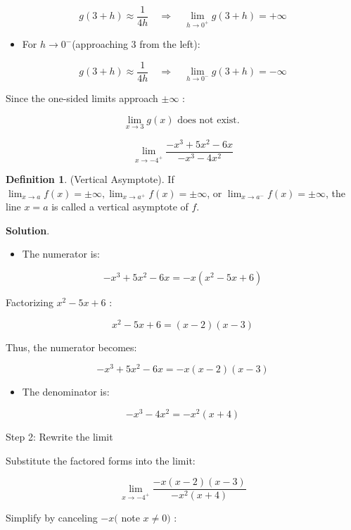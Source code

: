 \documentclass[
]{book}
\providecommand{\tightlist}{%
  \setlength{\itemsep}{0pt}\setlength{\parskip}{0pt}}
\theoremstyle{definition}
\newtheorem{definition}{Definition}[chapter]
\theoremstyle{definition}
\theoremstyle{definition}
\theoremstyle{definition}
\theoremstyle{remark}
\begin{document}
\[
g(3+h) \approx \frac{1}{4 h} \quad \Rightarrow \quad \lim _{h \rightarrow 0^{+}} g(3+h)=+\infty
\]

\begin{itemize}
\tightlist
\item
  For \(h \rightarrow 0^{-}\)(approaching 3 from the left):
\end{itemize}

\[
g(3+h) \approx \frac{1}{4 h} \quad \Rightarrow \quad \lim _{h \rightarrow 0^{-}} g(3+h)=-\infty
\]

Since the one-sided limits approach \(\pm \infty\) :

\[
\lim _{x \rightarrow 3} g(x) \text { does not exist. }
\]

\[
\lim _{x \rightarrow-4^{+}} \frac{-x^{3}+5 x^{2}-6 x}{-x^{3}-4 x^{2}}
\]

\begin{definition}
\protect\hypertarget{def:unnamed-chunk-43}{}\label{def:unnamed-chunk-43}(Vertical Asymptote). If \(\lim _{x \rightarrow a} f(x)= \pm \infty, \lim _{x \rightarrow a^{+}} f(x)= \pm \infty\), or \(\lim _{x \rightarrow a^{-}} f(x)= \pm \infty\), the line \(x=a\) is called a vertical asymptote of \(f\).
\end{definition}

\textbf{Solution}.

\begin{itemize}
\tightlist
\item
  The numerator is:
\end{itemize}

\[
-x^{3}+5 x^{2}-6 x=-x\left(x^{2}-5 x+6\right)
\]

Factorizing \(x^{2}-5 x+6\) :

\[
x^{2}-5 x+6=(x-2)(x-3)
\]

Thus, the numerator becomes:

\[
-x^{3}+5 x^{2}-6 x=-x(x-2)(x-3)
\]

\begin{itemize}
\tightlist
\item
  The denominator is:
\end{itemize}

\[
-x^{3}-4 x^{2}=-x^{2}(x+4)
\]

Step 2: Rewrite the limit

Substitute the factored forms into the limit:

\[
\lim _{x \rightarrow-4^{+}} \frac{-x(x-2)(x-3)}{-x^{2}(x+4)}
\]

Simplify by canceling \(-x(\) note \(x \neq 0)\) :
\end{document}

